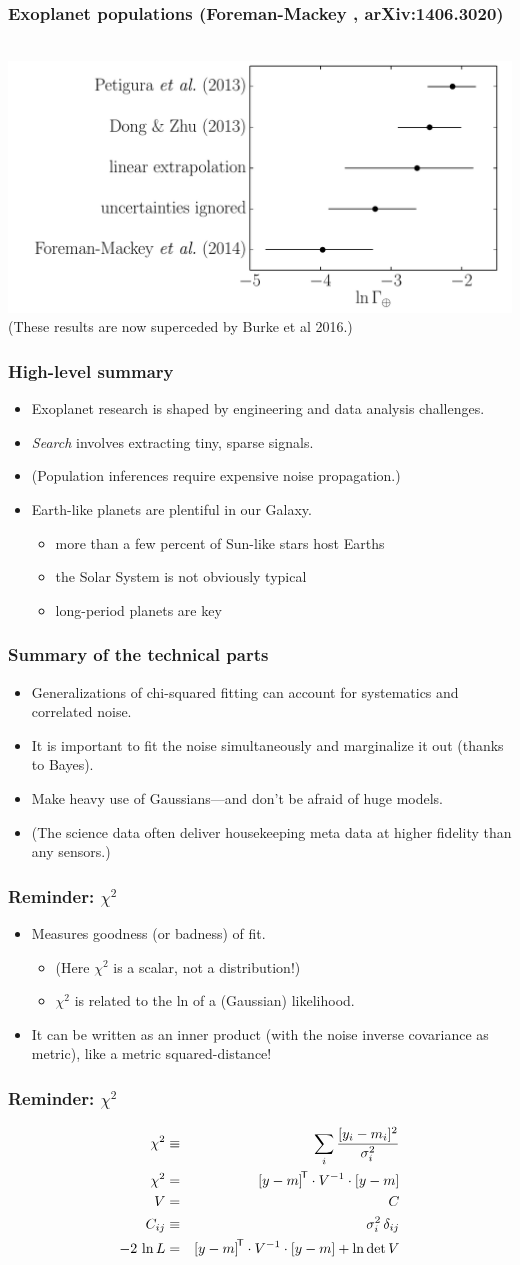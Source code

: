 \documentclass[pdftex]{beamer}
\newcommand{\conclusions}{%
\begin{frame}
  \frametitle{High-level summary}
  \begin{itemize}
  \item Exoplanet research is shaped by engineering and data analysis challenges.
  \item \emph{Search} involves extracting tiny, sparse signals.
  \item (Population inferences require expensive noise propagation.)
  \item Earth-like planets are plentiful in our Galaxy.
    \begin{itemize}
    \item more than a few percent of Sun-like stars host Earths
    \item the Solar System is not obviously typical
    \item long-period planets are key
    \end{itemize}
  \end{itemize}
\end{frame}

\begin{frame}
  \frametitle{Summary of the technical parts}
  \begin{itemize}
  \item Generalizations of chi-squared fitting can account for
    systematics and correlated noise.
  \item It is important to fit the noise simultaneously and
    marginalize it out (thanks to Bayes).
  \item Make heavy use of Gaussians---and don't be afraid of huge models.
  \item (The science data often deliver housekeeping meta data at
    higher fidelity than any sensors.)
  \end{itemize}
\end{frame}}
\begin{document}
\begin{frame}
  \frametitle{Exoplanet populations {\footnotesize (Foreman-Mackey \etal, arXiv:1406.3020)}}
  ~\hfill
  \includegraphics[height=0.75\textheight]{1406.3020/figures-comparison.pdf} \\
  (These results are now superceded by Burke et al 2016.)
\end{frame}

\conclusions

\begin{frame}
  \frametitle{Reminder: $\chi^2$}
  \begin{itemize}
  \item Measures goodness (or badness) of fit.
    \begin{itemize}
    \item (Here $\chi^2$ is a scalar, not a distribution!)
    \item $\chi^2$ is related to the ln of a (Gaussian) likelihood.
    \end{itemize}
  \item It can be written as an inner product (with the noise inverse
    covariance as metric), like a metric squared-distance!
  \end{itemize}
\end{frame}

\begin{frame}
  \frametitle{Reminder: $\chi^2$}
  \begin{eqnarray}
    \chi^2 &\equiv& \sum_i \frac{[y_i - m_i]^2}{\sigma_i^2}
    \nonumber \\
    \chi^2 &=& {[y - m]}^{\mathsf{\!T}}\cdot V^{-1}\cdot [y - m]
    \nonumber \\
    V &=& C
    \nonumber \\
    C_{ij} &\equiv& \sigma_i^2\,\delta_{ij}
    \nonumber \\
    -2\,\ln L &=& {[y - m]}^{\mathsf{\!T}}\cdot V^{-1}\cdot [y - m] + \ln\det V
    \nonumber
  \end{eqnarray}
\end{frame}
\end{document}
